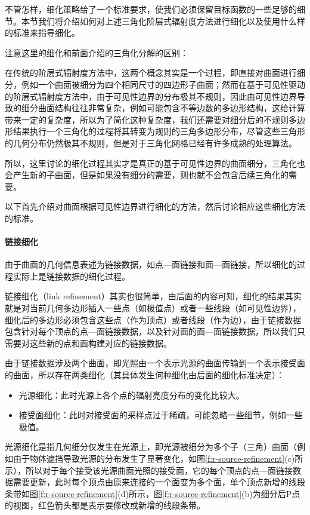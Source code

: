 不管怎样，细化策略给了一个标准要求，使我们必须保留目标函数的一些足够的细节。本节我们将介绍如何对上述三角化阶层式辐射度方法进行细化以及使用什么样的标准来指导细化。

\begin{myshaded}
	注意这里的细化和前面介绍的三角化分解的区别：
	
	在传统的阶层式辐射度方法中，这两个概念其实是一个过程，即直接对曲面进行细分，例如一个曲面被细分为四个相同尺寸的四边形子曲面；然而在基于可见性驱动的阶层式辐射度方法中，由于可见性边界的分布极其不规则，因此由可见性边界导致的细分曲面结构往往非常复杂，例如可能包含不等边数的多边形结构，这给计算带来一定的复杂度，所以为了简化这种复杂度，我们还需要对细分后的不规则多边形结果执行一个三角化的过程将其转变为规则的三角多边形分布，尽管这些三角形的几何分布仍然极其不规则，但是对于三角化网格已经有许多成熟的处理算法。
	
	所以，这里讨论的细化过程其实才是真正的基于可见性边界的曲面细分，三角化也会产生新的子曲面，但是如果没有细分的需要，则也就不会包含后续三角化的需要。
\end{myshaded}

以下首先介绍对曲面根据可见性边界进行细化的方法，然后讨论相应这些细化方法的标准。




\paragraph{链接细化}
由于曲面的几何信息表述为链接数据，如点—面链接和面—面链接，所以细化的过程实际上是链接数据的细化过程。

链接细化（link refinement）其实也很简单，由后面的内容可知，细化的结果其实就是对当前几何多边形插入一些点（如极值点）或者一些线段（如可见性边界），细化后的多边形必须包含这些点（作为顶点）或者线段（作为边），由于链接数据包含针对每个顶点的点—面链接数据，以及针对面的面—面链接数据，所以我们只需要对这些新的点和面构建对应的链接数据。

由于链接数据涉及两个曲面，即光照由一个表示光源的曲面传输到一个表示接受面的曲面，所以存在两类细化（其具体发生何种细化由后面的细化标准决定）：

\begin{itemize}
	\item 光源细化：此时光源上各个点的辐射亮度分布的变化比较大。
	\item 接受面细化：此时对接受面的采样点过于稀疏，可能忽略一些细节，例如一些极值。
\end{itemize}

光源细化是指几何细分仅发生在光源上，即光源被细分为多个子（三角）曲面（例如由于物体遮挡导致光源的分布发生了显著变化，如图\ref{f:r-source-refinement}(c)所示），所以对于每个接受该光源曲面光照的接受面，它的每个顶点的点—面链接数据需要更新，此时每个顶点由原来连接的一个面变为多个面，单个顶点新增的线段条带如图\ref{f:r-source-refinement}(d)所示，图\ref{f:r-source-refinement}(b)为细分后P点的视图，红色箭头都是表示要修改或新增的线段条带。

